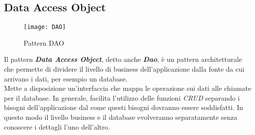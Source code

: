 \subsection*{Data Access Object}
 \begin{figure}[H]
    \centering 
    \texttt{[image: DAO]} 
    \bigskip
    \caption{Pattern DAO}
\end{figure}
Il pattern \textit{\textbf{Data Access Object}}, detto anche \textit{\textbf{Dao}}, è un pattern architetturale che permette di dividere il livello di business dell'applicazione dalla fonte da cui arrivano i dati, per esempio un database. \\
Mette a disposizione un'interfaccia che mappa le operazione sui dati alle chiamate per il database. In generale, facilita l'utilizzo delle funzioni \textit{CRUD} separando i bisogni dell'applicazione dal come questi bisogni dovranno essere soddisfatti. In questo modo il livello business e il database evolveranno separatamente senza conoscere i dettagli l'uno dell'altro.
